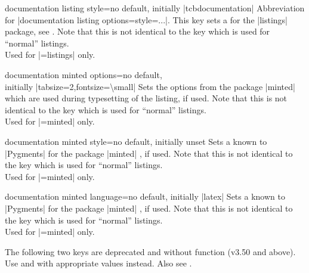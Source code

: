 \begin{docTcbKey}{documentation listing style}{=}{no default, initially |tcbdocumentation|}
  Abbreviation for |documentation listing options={style=...}|.
  This key sets a 
  for the |listings| package, see \cite{hoffmann:listings}.
  Note that this is not identical to the key
   which is used for \enquote{normal} listings.\\
  Used for |=listings| only.
\end{docTcbKey}

\begin{docTcbKey}{documentation minted options}{=}{no default,\\\hspace*{\fill} initially |tabsize=2,fontsize=\textbackslash small|}
  Sets the options from the package |minted| \cite{poore:minted}
  which are used during typesetting of the listing, if used.
  Note that this is not identical to the key
   which is used for \enquote{normal} listings.\\
  Used for |=minted| only.
\end{docTcbKey}

\begin{docTcbKey}{documentation minted style}{=}{no default, initially unset}
  Sets a  known to |Pygments| \cite{pygments:web} for
  the package |minted| \cite{poore:minted}, if used.
  Note that this is not identical to the key
   which is used for \enquote{normal} listings.\\
  Used for |=minted| only.
\end{docTcbKey}

\begin{docTcbKey}[][doc new=2017-04-24]{documentation minted language}{=}{no default, initially |latex|}
  Sets a  known to |Pygments| \cite{pygments:web}
  for the package |minted| \cite{poore:minted}, if used.
  Note that this is not identical to the key
   which is used for \enquote{normal} listings.\\
  Used for |=minted| only.
\end{docTcbKey}


\begin{marker}
The following two keys are deprecated and without function (v3.50 and above).
Use  and  with appropriate values
instead. Also see .
\end{marker}

